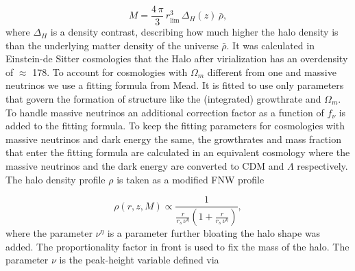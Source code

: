 \documentclass[../main.tex]{subfiles}
\begin{document}
\begin{equation}
    M = \frac{4\,\pi}{3}\,r_\mathrm{lim}^3\, \Delta_H(z)\,\bar{\rho},
\end{equation}
where $\Delta_H$ is a density contrast, describing how much higher the halo density is than the underlying matter density of the universe $\bar{\rho}$. It was calculated in Einstein-de Sitter cosmologies that the Halo after virialization has an overdensity of $\approx$ 178. To account for cosmologies with $\Omega_m$ different from one and massive neutrinos we use a fitting formula from Mead\cite{Mead_2016}. It is fitted to use only parameters that govern the formation of structure like the (integrated) growthrate and $\Omega_m$. To handle massive neutrinos an additional correction factor as a function of $f_\nu$ is added to the fitting formula. To keep the fitting parameters for cosmologies with massive neutrinos and dark energy the same, the growthrates and mass fraction that enter the fitting formula are calculated in an equivalent cosmology where the massive neutrinos and the dark energy are converted to CDM and $\Lambda$ respectively.\\
The halo density profile $\rho$ is taken as a modified FNW \cite{Navarro_1997} profile 

\begin{equation}
    \rho(r,z,M) \propto \frac{1}{\frac{r}{r_s\,\nu^\eta}\left(1+\frac{r}{r_s\,\nu^\eta}\right)},
\end{equation}
where the parameter $\nu^\eta$ is a parameter further bloating the halo shape was added. The proportionality factor in front is used to fix the mass of the halo. The parameter $\nu$ is the peak-height variable defined via 
\end{document}
